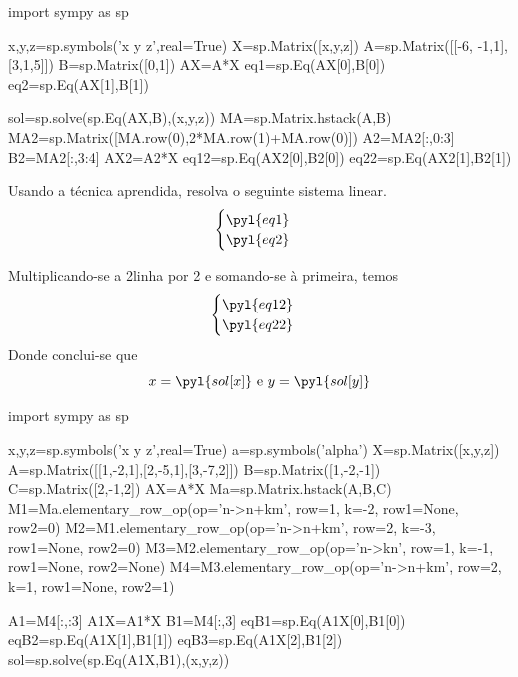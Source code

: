 \question

\begin{pycode}
import sympy as sp

x,y,z=sp.symbols('x y z',real=True)
X=sp.Matrix([x,y,z])
A=sp.Matrix([[-6, -1,1],[3,1,5]])
B=sp.Matrix([0,1])
AX=A*X
eq1=sp.Eq(AX[0],B[0])
eq2=sp.Eq(AX[1],B[1])

sol=sp.solve(sp.Eq(AX,B),(x,y,z))
MA=sp.Matrix.hstack(A,B)
MA2=sp.Matrix([MA.row(0),2*MA.row(1)+MA.row(0)])
A2=MA2[:,0:3]
B2=MA2[:,3:4]
AX2=A2*X
eq12=sp.Eq(AX2[0],B2[0])
eq22=sp.Eq(AX2[1],B2[1])
\end{pycode}

\question 
Usando a técnica aprendida, resolva o seguinte sistema linear.
\[\begin{cases}
\pyl{eq1}\\
\pyl{eq2}
\end{cases}\]


\begin{solution} Multiplicando-se a 2\fm linha por 2 e somando-se à primeira, temos
\[\begin{cases}
\pyl{eq12}\\
\pyl{eq22}
\end{cases}\]
Donde conclui-se que
\[x=\pyl{sol[x]} \text{ e } y=\pyl{sol[y]}\]

\end{solution}



\begin{pycode}
import sympy as sp

x,y,z=sp.symbols('x y z',real=True)
a=sp.symbols('alpha')
X=sp.Matrix([x,y,z])
A=sp.Matrix([[1,-2,1],[2,-5,1],[3,-7,2]])
B=sp.Matrix([1,-2,-1])
C=sp.Matrix([2,-1,2])
AX=A*X
Ma=sp.Matrix.hstack(A,B,C)
M1=Ma.elementary_row_op(op='n->n+km', row=1, k=-2, row1=None, row2=0)
M2=M1.elementary_row_op(op='n->n+km', row=2, k=-3, row1=None, row2=0)
M3=M2.elementary_row_op(op='n->kn', row=1, k=-1, row1=None, row2=None)
M4=M3.elementary_row_op(op='n->n+km', row=2, k=1, row1=None, row2=1)

A1=M4[:,:3]
A1X=A1*X
B1=M4[:,3]
eqB1=sp.Eq(A1X[0],B1[0])
eqB2=sp.Eq(A1X[1],B1[1])
eqB3=sp.Eq(A1X[2],B1[2])
sol=sp.solve(sp.Eq(A1X,B1),(x,y,z))
\end{pycode}


